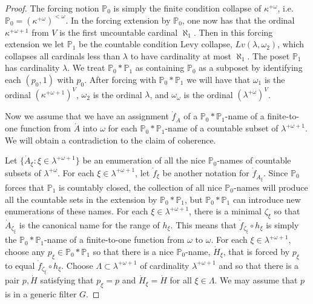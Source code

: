 \documentclass{rmmcart}
\theoremstyle{plain}
\theoremstyle{definition}
\theoremstyle{remark}
\theoremstyle{plain}
\theoremstyle{definition}
\theoremstyle{remark}
\begin{document}
\begin{proof}
            The forcing notion $\mathbb P_0$ is simply the finite condition
            collapse of $\kappa^{+\omega}$, i.e. $\mathbb P_0 = \left(
             \kappa^{+\omega}\right)^{<\omega}$. In the forcing extension by
             $\mathbb P_0$, one now has that the ordinal $\kappa^{+\omega+1}$
             from $V$ is the first uncountable cardinal $\aleph_1$. Then in this
             forcing extension we let $\mathbb P_1$ be the countable condition
             Levy collapse, $Lv(\lambda,\omega_2)$, which collapses all cardinals
             less than $\lambda$ to have cardinality at most $\aleph_1$. The poset
             $\mathbb P_1$ has cardinality $\lambda$. We treat
            $\mathbb P_0*\mathbb P_1$ as containing $\mathbb P_0$
            as a subposet by identifying each $(p_0,1)$ with $p_0$.
            After forcing with $\mathbb P_0*\mathbb P_1$ we will have
            that $\omega_1$ is the ordinal $\left(\kappa^{+\omega+1}\right)^V$,
             $\omega_2$ is the ordinal $\lambda$, and $\omega_\omega$ is the
             ordinal $\left(\lambda^{+\omega}\right)^V$.





            Now we assume that we have an assignment $\dot f_{\dot A}$ of a
             $\mathbb P_0*\mathbb P_1$-name of a finite-to-one function from
             $\dot A$ into $\omega$ for each
             $\mathbb P_0*\mathbb P_1$-name of a countable subset of
             $\lambda^{+\omega+1}$. We will obtain a contradiction
             to the claim of coherence.

            Let $\{ \dot A_\xi : \xi \in \lambda^{+\omega+1}\}$ be an enumeration
            of all the  nice $\mathbb P_0$-names of countable
            subsets of $\lambda^{+\omega}$. For each $\xi\in \lambda^{+\omega+1}$,
             let $\dot f_\xi$ be another notation for $\dot f_{\dot A_\xi}$.
            Since $\mathbb P_0$ forces that $\mathbb P_1$ is countably closed,
            the collection of all nice  $\mathbb P_0$-names will produce all
            the countable sets in the extension by $\mathbb P_0* \mathbb
            P_1$, but $\mathbb P_0*\mathbb P_1$ can introduce new enumerations of
            these names.
            For each $\xi\in \lambda^{+\omega+1}$,
            there is a minimal $\zeta_\xi$ so that $\dot A_{\zeta_\xi}$ is the
            canonical name for the range of $h_\xi$. This means that
             $\dot f_{\zeta_\xi} \circ h_\xi$ is simply the
             $\mathbb P_0 *\mathbb P_1$-name of a finite-to-one function from
             $\omega$ to $\omega$.
              For each $\xi\in \lambda^{+\omega+1}$,
             choose any $p_\xi \in \mathbb P_0*\mathbb P_1$ so that
             there is a nice $\mathbb P_0$-name, $\dot H_\xi$,
             that is forced by
             $p_\xi$  to equal $\dot f_{\zeta_\xi}\circ h_\xi$.
              Choose $\Lambda\subset \lambda^{+\omega+1}$
              of cardinality $\lambda^{+\omega+1}$
              and so that there is a pair $p,\dot H$
              satisfying that $p_\xi = p$ and $\dot H_\xi = \dot H$
              for all $\xi\in \Lambda$. We may assume that $p$
              is in a generic filter $  G$.



\end{proof}
\end{document}
